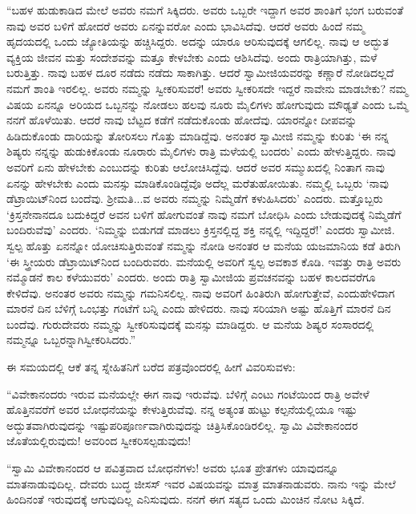  “ಬಹಳ ಹುಡುಕಾಡಿದ ಮೇಲೆ ಅವರು ನಮಗೆ ಸಿಕ್ಕಿದರು. ಅವರು ಒಬ್ಬರೇ ಇದ್ದಾಗ ಅವರ ಶಾಂತಿಗೆ ಭಂಗ ಬರುವಂತೆ ನಾವು ಅವರ ಬಳಿಗೆ ಹೋದರೆ ಅವರು ಏನನ್ನುವರೋ ಎಂದು ಭಾವಿಸಿದೆವು. ಆದರೆ ಅವರು ಹಿಂದೆ ನಮ್ಮ ಹೃದಯದಲ್ಲಿ ಒಂದು ಜ್ಯೋತಿಯನ್ನು ಹಚ್ಚಿಸಿದ್ದರು. ಅದನ್ನು ಯಾರೂ ಆರಿಸುವುದಕ್ಕೆ ಆಗಲಿಲ್ಲ. ನಾವು ಆ ಅದ್ಭುತ ವ್ಯಕ್ತಿಯ ಜೀವನ ಮತ್ತು ಸಂದೇಶವನ್ನು ಮತ್ತೂ ಕೇಳಬೇಕು ಎಂದು ಆಶಿಸಿದೆವು. ಅಂದು ರಾತ್ರಿಯಾಗಿತ್ತು, ಮಳೆ ಬರುತ್ತಿತ್ತು. ನಾವು ಬಹಳ ದೂರ ನಡೆದು ನಡೆದು ಸಾಕಾಗಿತ್ತು. ಆದರೆ ಸ್ವಾಮೀಜಿಯವರನ್ನು ಕಣ್ಣಾರೆ ನೋಡಿದಲ್ಲದೆ ನಮಗೆ ಶಾಂತಿ ಇರಲಿಲ್ಲ. ಅವರು ನಮ್ಮನ್ನು ಸ್ವೀಕರಿಸುವರೆ! ಅವರು ಸ್ವೀಕರಿಸದೇ ಇದ್ದರೆ ನಾವೇನು ಮಾಡಬೇಕು? ನಮ್ಮ ವಿಷಯ ಏನನ್ನೂ ಅರಿಯದ ಒಬ್ಬನನ್ನು ನೋಡಲು ಹಲವು ನೂರು ಮೈಲಿಗಳು ಹೋಗುವುದು ಮೌಢ್ಯತೆ ಎಂದು ಒಮ್ಮೆ ನನಗೆ ಹೊಳೆಯಿತು. ಆದರೆ ನಾವು ಬೆಟ್ಟದ ಕಡೆಗೆ ನಡೆದುಕೊಂಡು ಹೋದೆವು. ಯಾರನ್ನೋ ದೀಪವನ್ನು ಹಿಡಿದುಕೊಂಡು ದಾರಿಯನ್ನು ತೋರಿಸಲು ಗೊತ್ತು ಮಾಡಿದ್ದೆವು. ಅನಂತರ ಸ್ವಾಮೀಜಿ ನಮ್ಮನ್ನು ಕುರಿತು ‘ಈ ನನ್ನ ಶಿಷ್ಯರು ನನ್ನನ್ನು ಹುಡುಕಿಕೊಂಡು ನೂರಾರು ಮೈಲಿಗಳು ರಾತ್ರಿ ಮಳೆಯಲ್ಲಿ ಬಂದರು’ ಎಂದು ಹೇಳುತ್ತಿದ್ದರು. ನಾವು ಅವರಿಗೆ ಏನು ಹೇಳಬೇಕು ಎಂಬುದನ್ನು ಕುರಿತು ಆಲೋಚಿಸಿದ್ದೆವು. ಆದರೆ ಅವರ ಸಮ್ಮುಖದಲ್ಲಿ ನಿಂತಾಗ ನಾವು ಏನನ್ನು ಹೇಳಬೇಕು ಎಂದು ಮನಸ್ಸು ಮಾಡಿಕೊಂಡಿದ್ದೆವೊ ಅದೆಲ್ಲ ಮರೆತುಹೋಯಿತು. ನಮ್ಮಲ್ಲಿ ಒಬ್ಬರು ‘ನಾವು ಡೆಟ್ರಾಯಿಟ್‍ನಿಂದ ಬಂದೆವು. ಶ‍್ರೀಮತಿ...ವ ಅವರು ನಮ್ಮನ್ನು ನಿಮ್ಮೆಡೆಗೆ ಕಳುಹಿಸಿದರು’ ಎಂದರು. ಮತ್ತೊಬ್ಬರು ‘ಕ್ರಿಸ್ತನೇನಾನದೂ ಬದುಕಿದ್ದರೆ ಅವನ ಬಳಿಗೆ ಹೋಗುವಂತೆ ನಾವು ನಮಗೆ ಬೋಧಿಸಿ ಎಂದು ಬೇಡುವುದಕ್ಕೆ ನಿಮ್ಮೆಡೆಗೆ ಬಂದಿರುವೆವು’ ಎಂದರು. ‘ನಿಮ್ಮನ್ನು ಬಿಡುಗಡೆ ಮಾಡಲು ಕ್ರಿಸ್ತನಲ್ಲಿದ್ದ ಶಕ್ತಿ ನನ್ನಲ್ಲಿ ಇದ್ದಿದ್ದರೆ!’ ಎಂದರು ಸ್ವಾಮೀಜಿ. ಸ್ವಲ್ಪ ಹೊತ್ತು ಏನನ್ನೋ ಯೋಚಿಸುತ್ತಿರುವಂತೆ ನಮ್ಮನ್ನು ನೋಡಿ ಅನಂತರ ಆ ಮನೆಯ ಯಜಮಾನಿಯ ಕಡೆ ತಿರುಗಿ ‘ಈ ಸ್ತ್ರೀಯರು ಡೆಟ್ರಾಯಿಟ್‍ನಿಂದ ಬಂದಿರುವರು. ಮನೆಯಲ್ಲಿ ಅವರಿಗೆ ಸ್ವಲ್ಪ ಅವಕಾಶ ಕೊಡಿ. ಇವತ್ತು ರಾತ್ರಿ ಅವರು ನಮ್ಮೊಡನೆ ಕಾಲ ಕಳೆಯುವರು’ ಎಂದರು. ಅಂದು ರಾತ್ರಿ ಸ್ವಾಮೀಜಿಯ ಪ್ರವಚನವನ್ನು ಬಹಳ ಕಾಲದವರೆಗೂ ಕೇಳಿದೆವು. ಅನಂತರ ಅವರು ನಮ್ಮನ್ನು ಗಮನಿಸಲಿಲ್ಲ. ನಾವು ಅವರಿಗೆ ಹಿಂತಿರುಗಿ ಹೋಗುತ್ತೇವೆ, ಎಂದು\break ಹೇಳಿದಾಗ ಮಾರನೆ ದಿನ ಬೆಳಿಗ್ಗೆ ಒಂಭತ್ತು ಗಂಟೆಗೆ ಬನ್ನಿ ಎಂದು ಹೇಳಿದರು. ನಾವು ಸರಿಯಾಗಿ ಅಷ್ಟು ಹೊತ್ತಿಗೆ ಮಾರನೆ ದಿನ ಬಂದೆವು. ಗುರುದೇವರು ನಮ್ಮನ್ನು ಸ್ವೀಕರಿಸುವುದಕ್ಕೆ ಮನಸ್ಸು ಮಾಡಿದ್ದರು. ಆ ಮನೆಯ ಶಿಷ್ಯರ ಸಂಸಾರದಲ್ಲಿ ನಮ್ಮನ್ನೂ ಒಬ್ಬರನ್ನಾಗಿ\break ಸ್ವೀಕರಿಸಿದರು.” 

 ಈ ಸಮಯದಲ್ಲಿ ಆಕೆ ತನ್ನ ಸ್ನೇಹಿತನಿಗೆ ಬರೆದ ಪತ್ರವೊಂದರಲ್ಲಿ ಹೀಗೆ ವಿವರಿಸುವಳು: 

 “ವಿವೇಕಾನಂದರು ಇರುವ ಮನೆಯಲ್ಲೇ ಈಗ ನಾವು ಇರುವೆವು. ಬೆಳಿಗ್ಗೆ ಎಂಟು ಗಂಟೆಯಿಂದ ರಾತ್ರಿ ಅವೇಳೆ ಹೊತ್ತಿನವರೆಗೆ ಅವರ ಬೋಧನೆಯನ್ನು ಕೇಳುತ್ತಿರುವೆವು. ನನ್ನ ಅತ್ಯಂತ ಹುಟ್ಟು ಕಲ್ಪನೆಯಲ್ಲಿಯೂ ಇಷ್ಟು ಅದ್ಭುತವಾಗಿರುವುದನ್ನು ಇಷ್ಟು\break ಪರಿಪೂರ್ಣವಾಗಿರುವುದನ್ನು ಚಿತ್ರಿಸಿಕೊಂಡಿರಲಿಲ್ಲ. ಸ್ವಾಮಿ ವಿವೇಕಾನಂದರ ಜೊತೆಯಲ್ಲಿರುವುದು! ಅವರಿಂದ ಸ್ವೀಕರಿಸಲ್ಪಡುವುದು!

 “ಸ್ವಾಮಿ ವಿವೇಕಾನಂದರ ಆ ಪವಿತ್ರವಾದ ಬೋಧನೆಗಳು! ಅವರು ಭೂತ ಪ್ರೇತಗಳು ಯಾವುದನ್ನೂ ಮಾತನಾಡುವುದಿಲ್ಲ. ದೇವರು ಬುದ್ಧ ಜೀಸಸ್ ಇವರ ವಿಷಯವನ್ನು ಮಾತ್ರ ಮಾತನಾಡುವರು. ನಾನು ಇನ್ನು ಮೇಲೆ ಹಿಂದಿನಂತೆ ಇರುವುದಕ್ಕೆ ಆಗುವುದಿಲ್ಲ ಎನಿಸುವುದು. ನನಗೆ ಈಗ ಸತ್ಯದ ಒಂದು ಮಿಂಚಿನ ನೋಟ ಸಿಕ್ಕಿದೆ.

